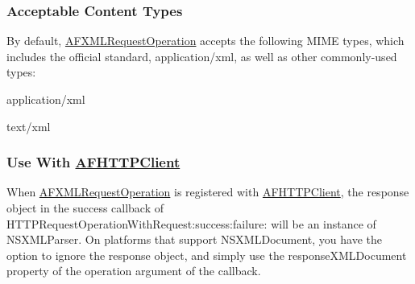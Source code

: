 \subsubsection*{Acceptable Content Types}

By default, {\ttfamily \hyperlink{interface_a_f_x_m_l_request_operation}{A\-F\-X\-M\-L\-Request\-Operation}} accepts the following M\-I\-M\-E types, which includes the official standard, {\ttfamily application/xml}, as well as other commonly-\/used types\-:


\begin{DoxyItemize}
\item {\ttfamily application/xml}
\item {\ttfamily text/xml}
\end{DoxyItemize}

\subsubsection*{Use With \hyperlink{interface_a_f_h_t_t_p_client}{A\-F\-H\-T\-T\-P\-Client}}

When {\ttfamily \hyperlink{interface_a_f_x_m_l_request_operation}{A\-F\-X\-M\-L\-Request\-Operation}} is registered with {\ttfamily \hyperlink{interface_a_f_h_t_t_p_client}{A\-F\-H\-T\-T\-P\-Client}}, the response object in the success callback of {\ttfamily H\-T\-T\-P\-Request\-Operation\-With\-Request\-:success\-:failure\-:} will be an instance of {\ttfamily N\-S\-X\-M\-L\-Parser}. On platforms that support {\ttfamily N\-S\-X\-M\-L\-Document}, you have the option to ignore the response object, and simply use the {\ttfamily response\-X\-M\-L\-Document} property of the operation argument of the callback. 

